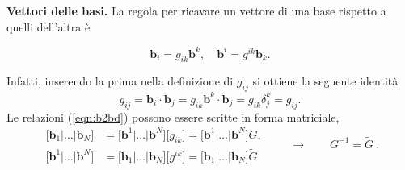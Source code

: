 \vspace{5pt} \noindent
\textbf{Vettori delle basi.} La regola per ricavare un vettore di una base rispetto a quelli dell'altra è
\begin{fBox}
  \begin{equation}\label{eqn:b2bd}
   \bm{b}_i = g_{ik} \bm{b}^k , \quad
   \bm{b}^i = g^{ik} \bm{b}_k .
  \end{equation}
\end{fBox}
 Infatti, inserendo la prima nella definizione di $g_{ij}$ si ottiene la seguente identità
  \begin{equation}
 g_{ij} = \bm{b}_i \cdot \bm{b}_j = g_{ik}\bm{b}^k \cdot \bm{b}_j = g_{ik} \delta^k_j = g_{ij} .
  \end{equation}
Le relazioni (\ref{eqn:b2bd}) possono essere scritte in forma matriciale,
\begin{equation}
\begin{aligned}
 \big[ \bm{b}_1 | \dots | \bm{b}_N\big] & =
 \big[ \bm{b}^1 | \dots | \bm{b}^N\big] \big[ g_{ik} \big] =
 \big[ \bm{b}^1 | \dots | \bm{b}^N\big] G , \\
 \big[ \bm{b}^1 | \dots | \bm{b}^N\big] & =
 \big[ \bm{b}_1 | \dots | \bm{b}_N\big] \big[ g^{ik} \big] =
    \big[ \bm{b}_1 | \dots | \bm{b}_N\big] \tilde{G}
\end{aligned} \qquad \rightarrow \qquad
 G^{-1} = \tilde{G} \ .
\end{equation}
%

